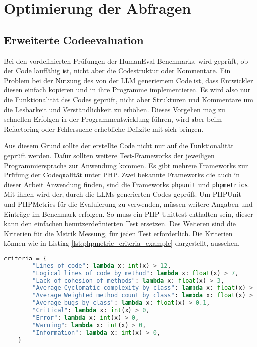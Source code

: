 

\section{Optimierung der Abfragen}


\subsection{Erweiterte Codeevaluation}
Bei den vordefinierten Prüfungen der HumanEval Benchmarks, wird geprüft, ob der Code lauffähig ist, nicht aber die Codestruktur oder Kommentare. Ein Problem bei der Nutzung des von der LLM generiertem Code ist, dass Entwickler diesen einfach kopieren und in ihre Programme implementieren. Es wird also nur die Funktionalität des Codes geprüft, nicht aber Strukturen und Kommentare um die Lesbarkeit und Verständlichkeit zu erhöhen. Dieses Vorgehen mag zu schnellen Erfolgen in der Programmentwicklung führen, wird aber beim Refactoring oder Fehlersuche erhebliche Defizite mit sich bringen.\vspace{0.2cm}

Aus diesem Grund sollte der erstellte Code nicht nur auf die Funktionalität geprüft werden. Dafür sollten weitere Test-Frameworks der jeweiligen Programmiersprache zur Anwendung kommen. Es gibt mehrere Frameworks zur Prüfung der Codequalität unter PHP. Zwei bekannte Frameworks die auch in dieser Arbeit Anwendung finden, sind die Frameworks \texttt{phpunit} und \texttt{phpmetrics}. Mit ihnen wird der, durch die LLMs generierten Codes geprüft.\vspace{0.2cm}
Um PHPUnit und PHPMetrics für die Evaluierung zu verwenden, müssen weitere Angaben und Einträge im Benchmark erfolgen. So muss ein PHP-Unittest enthalten sein, dieser kann den einfachen benutzerdefinierten Test ersetzen. Des Weiteren sind die Kriterien für die Metrik Messung, für jeden Test erforderlich. Die Kriterien können wie in Listing \ref{lst:phpmetric_criteria_example} dargestellt, aussehen.

\begin{lstlisting}[language=python,caption={Beispiel für Bewertungskriterien},label=lst:phpmetric_criteria_example]
	criteria = {
		"Lines of code": lambda x: int(x) > 12,
		"Logical lines of code by method": lambda x: float(x) > 7,
		"Lack of cohesion of methods": lambda x: float(x) > 3,
		"Average Cyclomatic complexity by class": lambda x: float(x) > 10,
		"Average Weighted method count by class": lambda x: float(x) > 20,
		"Average bugs by class": lambda x: float(x) > 0.1,
		"Critical": lambda x: int(x) > 0,
		"Error": lambda x: int(x) > 0,
		"Warning": lambda x: int(x) > 0,
		"Information": lambda x: int(x) > 0,
	}
\end{lstlisting}

